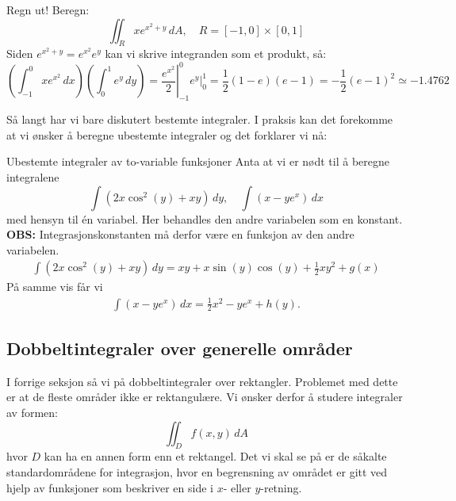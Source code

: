 \begin{eks}{Regn ut!}
Beregn:
\[
\iint_R  x e^{x^2 +y} \, dA, \quad R = [-1, 0] \times \left[0, 1\right]
\]
Siden $e^{x^2+y}=e^{x^2}e^y$ kan vi skrive integranden som et produkt, så:
\[
\left( \int_{-1}^{0} xe^{x^2} \, dx \right) \left( \int_0^{1} e^y \, dy \right) = \left.\frac{e^{x^2}}{2}\right|_{-1}^0 \left.e^y\right|_0^{1} = \frac{1}{2}(1-e)(e-1)=-\frac{1}{2}(e-1)^2 \simeq -1.4762
\]
\end{eks}

Så langt har vi bare diskutert bestemte integraler. I praksis kan det forekomme at vi ønsker å beregne ubestemte integraler og det forklarer vi nå:
\begin{eks}{Ubestemte integraler av to-variable funksjoner}
Anta at vi er nødt til å beregne integralene
\[
\int (2x \cos^2(y) + xy) \, dy, \quad \int (x - ye^{x}) \, dx
\]
med hensyn til én variabel. Her behandles den andre variabelen som en konstant. \textbf{OBS:} Integrasjonskonstanten må derfor være en funksjon av den andre variabelen.
\begin{align*}
\int (2x\cos^2 (y) + xy) \, dy = xy+x\sin(y)\cos(y) + \frac{1}{2}x y^2 + g(x)
\end{align*} 
På samme vis får vi
\begin{align*}
\int (x - ye^{x}) \, dx = \tfrac{1}{2} x^2 - y e^{x} + h(y).
\end{align*}
\end{eks}
\subsection{Dobbeltintegraler over generelle områder}

I forrige seksjon så vi på dobbeltintegraler over rektangler. Problemet med dette er at de fleste områder ikke er rektangulære. Vi ønsker derfor å studere integraler av formen:
\[
\iint_D f(x, y)\, dA
\]
hvor \( D \) kan ha en annen form enn et rektangel. Det vi skal se på er de såkalte standardområdene for integrasjon, hvor en begrensning av området er gitt ved hjelp av funksjoner som beskriver en side i $x$- eller $y$-retning.

